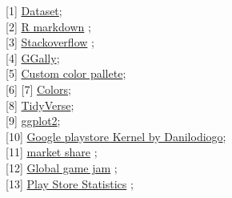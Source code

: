 \documentclass[
]{article}
\begin{document}
{[}1{]}
\href{https://www.kaggle.com/lava18/google-play-store-apps}{Dataset};\\
{[}2{]}
\href{https://bookdown.org/yihui/rmarkdown/html-document.html\#tabbed-sections}{R
markdown} ;\\
{[}3{]}
\href{https://stackoverflow.com/questions/3993301/how-to-format-number-values-for-ggplot2-legend/15007117}{Stackoverflow}
;\\
{[}4{]}
\href{https://ggobi.github.io/ggally/rd.html\#ggpairs}{GGally};\\
{[}5{]}
\href{https://drsimonj.svbtle.com/creating-corporate-colour-palettes-for-ggplot2}{Custom
color pallete};\\
{[}6{]} {[}7{]}
\href{https://hbr.org/2014/04/the-right-colors-make-data-easier-to-read}{Colors};\\
{[}8{]} \href{https://www.tidyverse.org/}{TidyVerse};\\
{[}9{]} \href{https://ggplot2.tidyverse.org/reference/}{ggplot2};\\
{[}10{]}
\href{https://www.kaggle.com/danilodiogo/google-play-store-eda-plotting-with-highcharts/code\#eda}{Google
playstore Kernel by Danilodiogo};\\
{[}11{]}
\href{https://gs.statcounter.com/os-market-share/mobile/worldwide}{market
share} ;\\
{[}12{]} \href{https://globalgamejam.org/}{Global game jam} ;\\
{[}13{]}
\href{https://www.statista.com/statistics/266210/number-of-available-applications-in-the-google-play-store/}{Play
Store Statistics} ;
\end{document}
